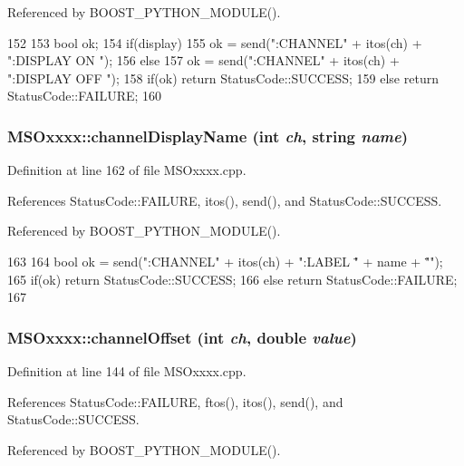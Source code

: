 Referenced by BOOST\_\-PYTHON\_\-MODULE().


\begin{DoxyCode}
152 {
153     bool ok;
154     if(display)     
155         ok = send(":CHANNEL" + itos(ch) + ":DISPLAY ON \n");
156     else
157         ok = send(":CHANNEL" + itos(ch) + ":DISPLAY OFF \n");
158     if(ok)  return StatusCode::SUCCESS;
159     else        return StatusCode::FAILURE; 
160 }
\end{DoxyCode}
\hypertarget{classMSOxxxx_af9851b9ce16b0e88e8691c8174ba54f0}{
\subsubsection[{channelDisplayName}]{ MSOxxxx::channelDisplayName (int {\em ch}, \/  string {\em name})}}
\label{classMSOxxxx_af9851b9ce16b0e88e8691c8174ba54f0}


Definition at line 162 of file MSOxxxx.cpp.

References StatusCode::FAILURE, itos(), send(), and StatusCode::SUCCESS.

Referenced by BOOST\_\-PYTHON\_\-MODULE().


\begin{DoxyCode}
163 {
164     bool ok = send(":CHANNEL" + itos(ch) + ":LABEL \"" + name + "\" \n");
165     if(ok)  return StatusCode::SUCCESS;
166     else        return StatusCode::FAILURE; 
167 }
\end{DoxyCode}
\hypertarget{classMSOxxxx_ab77c05543d9478b140466b7505651ab8}{
\subsubsection[{channelOffset}]{ MSOxxxx::channelOffset (int {\em ch}, \/  double {\em value})}}
\label{classMSOxxxx_ab77c05543d9478b140466b7505651ab8}


Definition at line 144 of file MSOxxxx.cpp.

References StatusCode::FAILURE, ftos(), itos(), send(), and StatusCode::SUCCESS.

Referenced by BOOST\_\-PYTHON\_\-MODULE().


